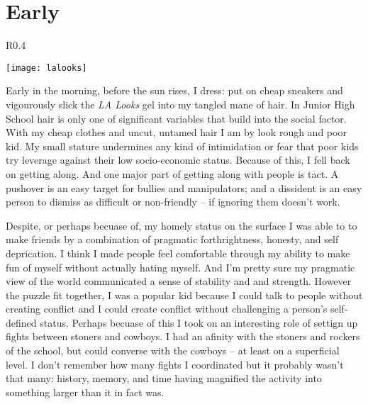 \section{Early}\begin{wrapfigure}{R}{0.4\textwidth}
         \vspace{-1cm}
        \begin{center}
        \texttt{[image: lalooks]}
        \end{center}
         \vspace{-1cm}
    \end{wrapfigure}
Early in the morning, before the sun rises, I dress: put on cheap sneakers and vigourously slick the {\sl LA Looks} gel into my tangled mane of hair. In Junior High School hair is only one of significant variables that build into the social factor. With my cheap clothes and uncut, untamed hair I am by look rough and poor kid. My small stature undermines any kind of intimidation or fear that poor kids try leverage against their low socio-economic status. Because of this, I fell back on getting along. And one major part of getting along with people is tact. A pushover is an easy target for bullies and manipulators; and a dissident is an easy person to dismiss as difficult or non-friendly -- if ignoring them doesn't work. 

Despite, or perhaps becuase of, my homely status on the surface I was able to to make friends by a combination of pragmatic forthrightness, honesty, and self deprication. I think I made people feel comfortable through my ability to make fun of myself without actually hating myself. And I'm pretty sure my pragmatic view of the world communicated a sense of stability and and strength. However the puzzle fit together, I was a popular kid because I could talk to people without creating conflict and I could create conflict without challenging a person's self-defined status. Perhaps becuase of this I took on an interesting role of settign up fights between stoners and cowboys. I had an afinity with the stoners and rockers of the school, but could converse with the cowboys -- at least on a superficial level. I don't remember how many fights I coordinated but it probably wasn't that many: history, memory, and time having magnified the activity into something larger than it in fact was. 

